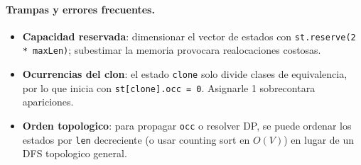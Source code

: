 \paragraph{Trampas y errores frecuentes.}
\begin{itemize}\setlength\itemsep{0pt}
	\item \textbf{Capacidad reservada}: dimensionar el vector de estados con \verb|st.reserve(2 * maxLen)|; subestimar la memoria provocara realocaciones costosas.
	\item \textbf{Ocurrencias del clon}: el estado \verb|clone| solo divide clases de equivalencia, por lo que inicia con \verb|st[clone].occ = 0|. Asignarle 1 sobrecontara apariciones.
	\item \textbf{Orden topologico}: para propagar \verb|occ| o resolver DP, se puede ordenar los estados por \verb|len| decreciente (o usar counting sort en $O(V)$) en lugar de un DFS topologico general.
\end{itemize}

